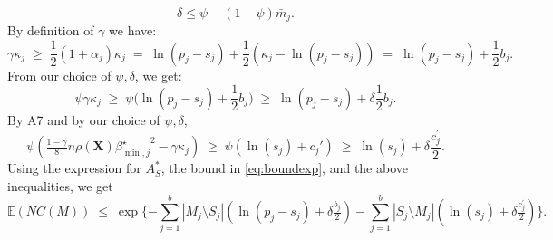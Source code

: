 \documentclass[aos]{imsart}
\theoremstyle{plain}
\newcommand{\E}{\mathbb{E}}
\newcommand{\bs}{\boldsymbol}
\begin{document}
\begin{supplement}
$$\delta \leq \psi-(1-\psi)\bar{m}_j.$$ 
By definition of $\gamma$ we have: 
$$
\gamma\kappa_j\;\geq\;\frac12 (1+\alpha_j)\kappa_j\;=\;\ln(p_j-s_j)+\frac12(\kappa_j-\ln(p_j-s_j)) \;=\; \ln(p_j-s_j)+ \frac12b_{j}.
$$
From our choice of $\psi,\delta$, we get:
$$\psi\gamma\kappa_j \;\geq\; \psi\big(\ln(p_j-s_j)+ \frac12b_{j}\big) \;\geq\;  \ln(p_j-s_j)+ \delta\frac12b_{j}.$$
By A7 and by our choice of $\psi,\delta$,
$$\psi\left(\tfrac{1-\gamma}{8} n \rho(\bs X) {\beta^{\star}_{\min,j}}^{2} - \gamma\kappa_j\right) \;\geq\; \psi\left(\ln(s_j)+c_j'\right) \;\geq\; \ln(s_j)+\delta \frac{c^{\prime}_j}{2}.
$$
Using the expression for $A_S^*$, the bound in \eqref{eq:boundexp}, and the above inequalities, we get
$$
\E(NC(M))\;\leq\;\exp\{- \sum_{j=1}^b |M_j\setminus S_j|(\ln(p_j-s_j)+\delta \tfrac{b_j}{2})-\sum_{j=1}^b |S_j\setminus M_j|(\ln(s_j)+\delta \tfrac{c^{\prime}_j}{2})\}.
$$


\end{supplement}
\end{document}
